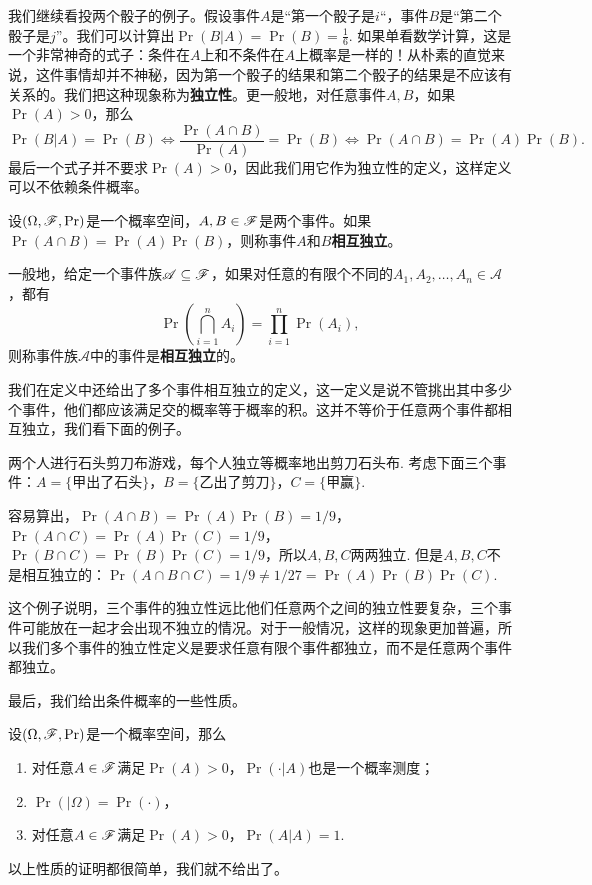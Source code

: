 我们继续看投两个骰子的例子。假设事件$A$是“第一个骰子是$i$“，事件$B$是“第二个骰子是$j$”。我们可以计算出$\Pr(B|A)=\Pr(B)=\frac{1}{6}$. 如果单看数学计算，这是一个非常神奇的式子：条件在$A$上和不条件在$A$上概率是一样的！从朴素的直觉来说，这件事情却并不神秘，因为第一个骰子的结果和第二个骰子的结果是不应该有关系的。我们把这种现象称为\textbf{独立性}。更一般地，对任意事件$A,B$，如果$\Pr(A)>0$，那么
\[\Pr(B|A)=\Pr(B)\iff \frac{\Pr(A\cap B)}{\Pr(A)}=\Pr(B)\iff \Pr(A\cap B)=\Pr(A)\Pr(B).\]
最后一个式子并不要求$\Pr(A)>0$，因此我们用它作为独立性的定义，这样定义可以不依赖条件概率。

\begin{definition}[独立性]
设$(\Omega,\mathscr{F},\Pr)$是一个概率空间，$A,B\in\mathscr{F}$是两个事件。如果$\Pr(A\cap B)=\Pr(A)\Pr(B)$，则称事件$A$和$B$\textbf{相互独立}。

一般地，给定一个事件族$\mathscr{A}\subseteq\mathscr{F}$，如果对任意的有限个不同的$A_1,A_2,\ldots,A_n\in\mathscr{A}$，都有
\[
    \Pr\left(\bigcap_{i=1}^n A_i\right) = \prod_{i=1}^n \Pr(A_i),
\]
则称事件族$\mathscr{A}$中的事件是\textbf{相互独立}的。
\end{definition}

我们在定义中还给出了多个事件相互独立的定义，这一定义是说不管挑出其中多少个事件，他们都应该满足交的概率等于概率的积。这并不等价于任意两个事件都相互独立，我们看下面的例子。

\begin{example}
两个人进行石头剪刀布游戏，每个人独立等概率地出剪刀石头布. 考虑下面三个事件：$A=\{\text{甲出了石头}\}$，$B=\{\text{乙出了剪刀}\}$，$C=\{\text{甲赢}\}$.

容易算出，$\Pr(A\cap B)=\Pr(A)\Pr(B)=1/9$，$\Pr(A\cap C)=\Pr(A)\Pr(C)=1/9$，$\Pr(B\cap C)=\Pr(B)\Pr(C)=1/9$，所以$A,B,C$两两独立. 但是$A,B,C$不是相互独立的：$\Pr(A\cap B\cap C)=1/9\neq 1/27=\Pr(A)\Pr(B)\Pr(C)$.
\end{example}

这个例子说明，三个事件的独立性远比他们任意两个之间的独立性要复杂，三个事件可能放在一起才会出现不独立的情况。对于一般情况，这样的现象更加普遍，所以我们多个事件的独立性定义是要求任意有限个事件都独立，而不是任意两个事件都独立。

最后，我们给出条件概率的一些性质。

\begin{proposition}\label{prop:conditional-probability}
设$(\Omega,\mathscr{F},\Pr)$是一个概率空间，那么
\begin{enumerate}
    \item 对任意$A\in\mathscr{F}$满足$\Pr(A)>0$，$\Pr(\cdot|A)$也是一个概率测度；
    \item $\Pr(|\Omega)=\Pr(\cdot)$，
    \item 对任意$A\in\mathscr{F}$满足$\Pr(A)>0$，$\Pr(A|A)=1$.
\end{enumerate}
\end{proposition}
以上性质的证明都很简单，我们就不给出了。

